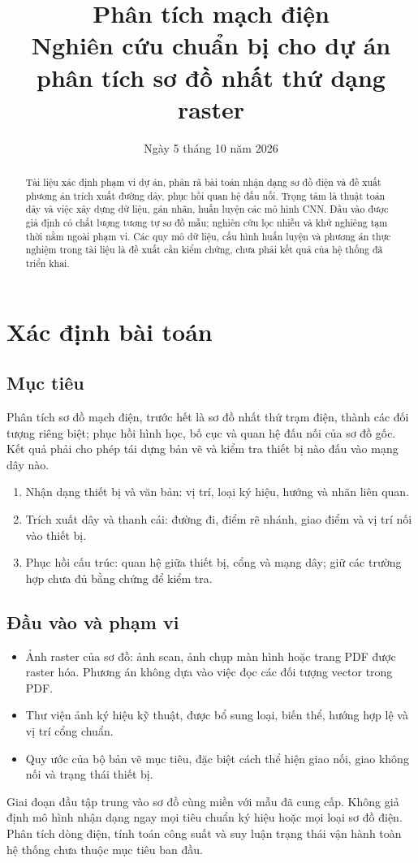 \documentclass[11pt,a4paper]{article}
\title{Phân tích mạch điện\\[4pt]
  \large Nghiên cứu chuẩn bị cho dự án phân tích sơ đồ nhất thứ dạng raster}
\author{}
\date{Ngày 5 tháng 10 năm 2026}
\begin{document}
\maketitle
\begin{abstract}
Tài liệu xác định phạm vi dự án, phân rã bài toán nhận dạng sơ đồ điện và đề xuất phương án trích xuất đường dây, phục hồi quan hệ đấu nối. Trọng tâm là thuật toán dây và việc xây dựng dữ liệu, gán nhãn, huấn luyện các mô hình CNN. Đầu vào được giả định có chất lượng tương tự sơ đồ mẫu; nghiên cứu lọc nhiễu và khử nghiêng tạm thời nằm ngoài phạm vi. Các quy mô dữ liệu, cấu hình huấn luyện và phương án thực nghiệm trong tài liệu là đề xuất cần kiểm chứng, chưa phải kết quả của hệ thống đã triển khai.
\end{abstract}
\setcounter{tocdepth}{1}
\tableofcontents
\newpage

\section{Xác định bài toán}
\subsection{Mục tiêu}
Phân tích sơ đồ mạch điện, trước hết là sơ đồ nhất thứ trạm điện, thành các đối tượng riêng biệt; phục hồi hình học, bố cục và quan hệ đấu nối của sơ đồ gốc. Kết quả phải cho phép tái dựng bản vẽ và kiểm tra thiết bị nào đấu vào mạng dây nào.
\begin{enumerate}
  \item Nhận dạng thiết bị và văn bản: vị trí, loại ký hiệu, hướng và nhãn liên quan.
  \item Trích xuất dây và thanh cái: đường đi, điểm rẽ nhánh, giao điểm và vị trí nối vào thiết bị.
  \item Phục hồi cấu trúc: quan hệ giữa thiết bị, cổng và mạng dây; giữ các trường hợp chưa đủ bằng chứng để kiểm tra.
\end{enumerate}

\subsection{Đầu vào và phạm vi}
\begin{itemize}
  \item Ảnh raster của sơ đồ: ảnh scan, ảnh chụp màn hình hoặc trang PDF được raster hóa. Phương án không dựa vào việc đọc các đối tượng vector trong PDF.
  \item Thư viện ảnh ký hiệu kỹ thuật, được bổ sung loại, biến thể, hướng hợp lệ và vị trí cổng chuẩn.
  \item Quy ước của bộ bản vẽ mục tiêu, đặc biệt cách thể hiện giao nối, giao không nối và trạng thái thiết bị.
\end{itemize}
Giai đoạn đầu tập trung vào sơ đồ cùng miền với mẫu đã cung cấp. Không giả định mô hình nhận dạng ngay mọi tiêu chuẩn ký hiệu hoặc mọi loại sơ đồ điện. Phân tích dòng điện, tính toán công suất và suy luận trạng thái vận hành toàn hệ thống chưa thuộc mục tiêu ban đầu.
\end{document}
